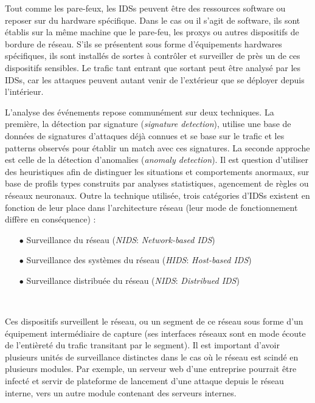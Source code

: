 \documentclass[]{article}
\newcommand{\minit}[1]{\noindent{\small\textbf{ \underline{#1}}}\vspace{0.2cm}}
\begin{document}
\par Tout comme les pare-feux, les IDSs peuvent être des ressources software ou reposer sur du hardware spécifique. Dans le cas ou il s'agit de software, ils sont établis sur la même machine que le pare-feu, les proxys ou autres dispositifs de bordure de réseau. S'ils se présentent sous forme d'équipements hardwares spécifiques, ils sont installés de sortes à contrôler et surveiller de près un de ces dispositifs sensibles. Le trafic tant entrant que sortant peut être analysé par les IDSs, car les attaques peuvent autant venir de l'extérieur que se déployer depuis l'intérieur.\\

\par L'analyse des événements repose communément sur deux techniques. La première, la détection par signature (\textit{signature detection}), utilise une base de données de signatures d'attaques déjà connues et se base sur le trafic et les patterns observés pour établir un match avec ces signatures. La seconde approche est celle de la détection d'anomalies (\textit{anomaly detection}). Il est question d'utiliser des heuristiques afin de distinguer les situations et comportements anormaux, sur base de profils types construits par analyses statistiques, agencement de règles ou réseaux neuronaux. Outre la technique utilisée, trois catégories d'IDSs existent en fonction de leur place dans l'architecture réseau (leur mode de fonctionnement diffère en conséquence) :
\vspace{0.3cm}
\begin{itemize}
\item[$\bullet$] Surveillance du réseau (\textit{NIDS}:\textit{ Network-based IDS})
\item[$\bullet$] Surveillance des systèmes du réseau (\textit{HIDS}:\textit{ Host-based IDS}) 
\item[$\bullet$] Surveillance distribuée du réseau (\textit{NIDS}:\textit{ Distribued IDS}) 
\end{itemize} 
~\\
\minit{Les NIDSs}

\par Ces dispositifs surveillent le réseau, ou un segment de ce réseau sous forme d'un équipement intermédiaire de capture (ses interfaces réseaux sont en mode écoute de l'entièreté du trafic transitant par le segment). Il est important d'avoir plusieurs unités de surveillance distinctes dans le cas où le réseau est scindé en plusieurs modules. Par exemple, un serveur web d'une entreprise pourrait être infecté et servir de plateforme de lancement d'une attaque depuis le réseau interne, vers un autre module contenant des serveurs internes.\\
\end{document}

